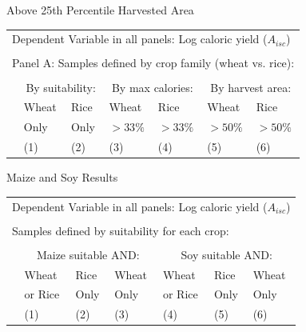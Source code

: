 \documentclass[10pt, xcolor=dvipsnames]{beamer}
\begin{document}
\begin{frame}{Above 25th Percentile Harvested Area}\label{harvarea}

{\footnotesize
\begin{tabularx}{\textwidth}{lXXXXXX}
\midrule
\multicolumn{7}{l}{Dependent Variable in all panels: Log caloric yield ($A_{isc}$)} \\ \\
\multicolumn{7}{l}{Panel A: Samples defined by crop family (wheat vs. rice):} \\ \\
 & \multicolumn{2}{c}{By suitability:} & \multicolumn{2}{c}{By max calories:} & \multicolumn{2}{c}{By harvest area:}\\ \cmidrule(lr){2-3} \cmidrule(lr){4-5} \cmidrule(lr){6-7} 
 & Wheat & Rice & Wheat  & Rice  & Wheat  & Rice \\
 & Only & Only &  $>33\%$ & $>33\%$ & $>50\%$ & $>50\%$   \\
 & (1) & (2) & (3) & (4) & (5) & (6) \\
\midrule

\midrule
\end{tabularx}
}

\hfill \hyperlink{robustness}{}
\end{frame}

\begin{frame}{Maize and Soy Results}\label{othercrop}

{\footnotesize
\begin{tabularx}{\textwidth}{lXXXXXX}
\midrule
\multicolumn{7}{l}{Dependent Variable in all panels: Log caloric yield ($A_{isc}$)} \\ \\
\multicolumn{7}{l}{Samples defined by suitability for each crop:} \\ \\
 & \multicolumn{3}{c}{Maize suitable AND:} & \multicolumn{3}{c}{Soy suitable AND:} \\ \cmidrule(lr){2-4} \cmidrule(lr){5-7}
 & Wheat & Rice & Wheat  & Wheat  & Rice  & Wheat \\
 & or Rice & Only & Only & or Rice & Only & Only   \\
 & (1) & (2) & (3) & (4) & (5) & (6) \\
\midrule

\midrule
\end{tabularx}
}

\hfill \hyperlink{robustness}{}
\end{frame}
\end{document}
